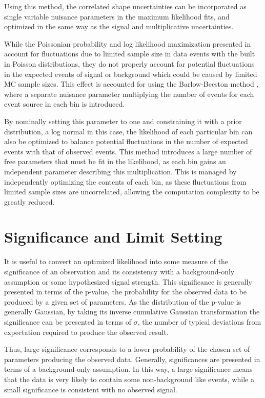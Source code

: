Using this method, the correlated shape uncertainties can be incorporated as single variable nuisance parameters in the maximum likelihood fits, and optimized in the same way as the signal and multiplicative uncertainties.

While the Poissonian probability and log likelihood maximization presented in  account for fluctuations due to limited sample size in data events with the built in Poisson distributions, they do not properly account for potential fluctuations in the expected events of signal or background which could be caused by limited MC sample sizes.
This effect is accounted for using the Barlow-Beeston method \cite{BarlowBeeston}, where a separate nuisance parameter multiplying the number of events for each event source in each bin is introduced.

By nominally setting this parameter to one and constraining it with a prior distribution, a log normal in this case, the likelihood of each particular bin can also be optimized to balance potential fluctuations in the number of expected events with that of observed events.
This method introduces a large number of free parameters that must be fit in the likelihood, as each bin gains an independent parameter describing this multiplication.
This is managed by independently optimizing the contents of each bin, as these fluctuations from limited sample sizes are uncorrelated, allowing the computation complexity to be greatly reduced.

\section{Significance and Limit Setting}
It is useful to convert an optimized likelihood into some measure of the significance of an observation and its consistency with a background-only assumption or some hypothesized signal strength. 
This significance is generally presented in terms of the p-value, the probability for the observed data to be produced by a given set of parameters. 
As the distribution of the p-value is generally Gaussian, by taking its inverse cumulative Gaussian transformation the significance can be presented in terms of $\sigma$, the number of typical deviations from expectation required to produce the observed result.

Thus, large significance corresponds to a lower probability of the chosen set of parameters producing the observed data.
Generally, significances are presented in terms of a background-only assumption. 
In this way, a large significance means that the data is very likely to contain some non-background like events, while a small significance is consistent with no observed signal.

